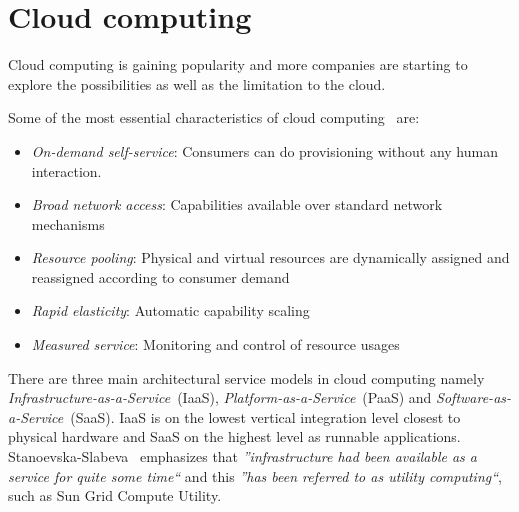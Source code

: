 



\section{Cloud computing}

Cloud computing is gaining popularity and more companies are starting 
to explore the possibilities as well as the limitation to the cloud.

Some of the most essential characteristics of cloud computing~\cite{nist:mell11} are:
\begin{itemize}
  \item \emph{On-demand self-service}: 
    Consumers can do provisioning without any human interaction.
  \item \emph{Broad network access}: Capabilities available over standard network mechanisms
  \item \emph{Resource pooling}: Physical and virtual resources are dynamically assigned
    and reassigned according to consumer demand
  \item \emph{Rapid elasticity}: Automatic capability scaling
  \item \emph{Measured service}: Monitoring and control of resource usages
\end{itemize}

There are three main architectural service models in cloud computing\cite{nist:mell11}
namely \emph{Infrastructure-as-a-Service}~(IaaS), \emph{Platform-as-a-Service}~(PaaS)
and \emph{Software-as-a-Service}~(SaaS).
IaaS is on the lowest vertical integration level closest to physical hardware and SaaS on the highest
level as runnable applications.
Stanoevska-Slabeva~\cite{introduction:wozniak10} emphasizes that
\emph{''infrastructure had been available as a service for quite some time``} and this 
\emph{''has been referred to as utility computing``}, such as Sun Grid Compute Utility.

